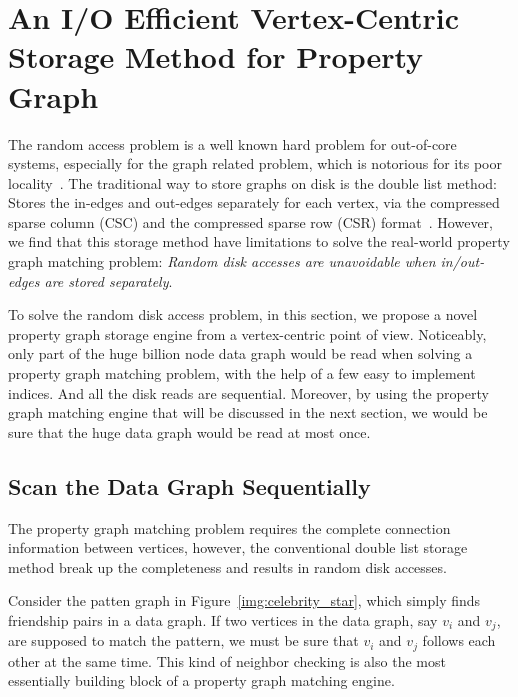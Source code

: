\section{An I/O Efficient Vertex-Centric Storage Method for Property Graph}\label{sec:storage}
The random access problem is a well known hard problem for out-of-core systems,
especially for the graph related problem, which is notorious for its poor locality~\cite{DBLP:conf/osdi/KyrolaBG12}.
The traditional way to store graphs on disk is the double list method:
Stores the in-edges and out-edges separately for each vertex,
via the compressed sparse column (CSC) and the compressed sparse row (CSR) format~\cite{DBLP:conf/sc/PearceGA10}.
However, we find that this storage method have limitations to solve the real-world property graph matching problem:
\emph{Random disk accesses are unavoidable when in/out-edges are stored separately}.

To solve the random disk access problem, in this section,
we propose a novel property graph storage engine from a vertex-centric point of view.
Noticeably, only part of the huge billion node data graph would be read when solving a property graph matching problem,
with the help of a few easy to implement indices.
And all the disk reads are sequential.
Moreover, by using the property graph matching engine that will be discussed in the next section,
we would be sure that the huge data graph would be read at most once.
\subsection{Scan the Data Graph Sequentially}
The property graph matching problem requires the complete connection information between vertices,
however, the conventional double list storage method break up the completeness and results in random disk accesses.

Consider the patten graph in Figure~\ref{img:celebrity_star}, which simply finds friendship pairs in a data graph.
If two vertices in the data graph, say $v_i$ and $v_j$, are supposed to match the pattern,
we must be sure that $v_i$ and $v_j$ follows each other at the same time.
This kind of neighbor checking is also the most essentially building block of a property graph matching engine.

